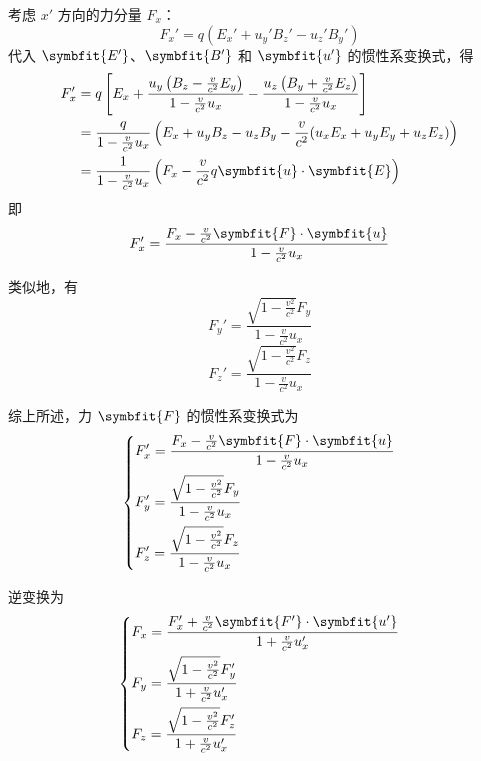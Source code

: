 考虑 $x'$ 方向的力分量 $F_x$：
\begin{equation}
    F_x' = q \left( E_x' + u_y' B_z' - u_z' B_y' \right)
\end{equation}
代入 $\symbfit{E'}$、$\symbfit{B'}$ 和 $\symbfit{u'}$ 的惯性系变换式，得
\begin{equation}
    \begin{aligned}
        F_x' & = q \left[ E_x + \frac{u_y \left( B_z - \frac{v}{c^2} E_y \right)}{1 - \frac{v}{c^2} u_x} - \frac{u_z \left( B_y + \frac{v}{c^2} E_z \right)}{1 - \frac{v}{c^2} u_x} \right] \\
             & = \frac{q}{1 - \frac{v}{c^2} u_x} \left( E_x + u_y B_z - u_z B_y - \frac{v}{c^2} (u_x E_x + u_y E_y + u_z E_z) \right)                                                       \\
             & = \frac{1}{1 - \frac{v}{c^2} u_x} \left( F_x - \frac{v}{c^2} q \symbfit{u} \cdot \symbfit{E} \right)
    \end{aligned}
\end{equation}
即
\begin{equation}
    F_x' = \frac{F_x - \frac{v}{c^2} \symbfit{F} \cdot \symbfit{u}}{1 - \frac{v}{c^2} u_x}
\end{equation}

类似地，有
\begin{equation}
    F_y' = \frac{\sqrt{1 - \frac{v^2}{c^2}} F_y}{1 - \frac{v}{c^2} u_x}
\end{equation}
\begin{equation}
    F_z' = \frac{\sqrt{1 - \frac{v^2}{c^2}} F_z}{1 - \frac{v}{c^2} u_x}
\end{equation}

综上所述，力 $\symbfit{F}$ 的惯性系变换式为
\begin{equation}
    \left\{
    \begin{aligned}
         & F_x' = \frac{F_x - \frac{v}{c^2} \symbfit{F} \cdot \symbfit{u}}{1 - \frac{v}{c^2} u_x} \\
         & F_y' = \frac{\sqrt{1 - \frac{v^2}{c^2}} F_y}{1 - \frac{v}{c^2} u_x}                    \\
         & F_z' = \frac{\sqrt{1 - \frac{v^2}{c^2}} F_z}{1 - \frac{v}{c^2} u_x}
    \end{aligned}
    \right.
    \label{eq:relativistic-force-transformation}
\end{equation}

逆变换为
\begin{equation}
    \left\{
    \begin{aligned}
         & F_x = \frac{F_x' + \frac{v}{c^2} \symbfit{F'} \cdot \symbfit{u'}}{1 + \frac{v}{c^2} u_x'} \\
         & F_y = \frac{\sqrt{1 - \frac{v^2}{c^2}} F_y'}{1 + \frac{v}{c^2} u_x'}                      \\
         & F_z = \frac{\sqrt{1 - \frac{v^2}{c^2}} F_z'}{1 + \frac{v}{c^2} u_x'}
    \end{aligned}
    \right.
\end{equation}

